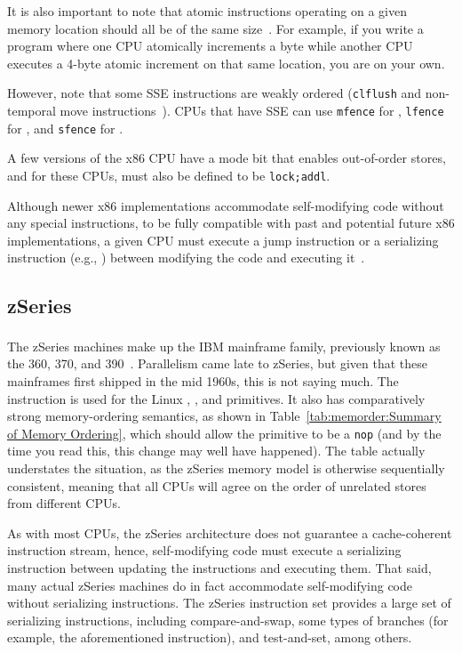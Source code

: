 It is also important to note that atomic instructions operating
on a given memory location should all be of the same
size~\cite[Section 8.1.2.2]{Intel64IA32v3A2011}.
For example, if you write a program where one CPU atomically increments
a byte while another CPU executes a 4-byte atomic increment on
that same location, you are on your own.

However, note that some SSE instructions are weakly ordered ({\tt clflush}
and non-temporal move instructions~\cite{IntelXeonV2b-96a}).
CPUs that have SSE can use {\tt mfence} for ,
{\tt lfence} for , and {\tt sfence} for .

A few versions of the x86 CPU have a mode bit that enables out-of-order
stores, and for these CPUs,  must also be defined to
be {\tt lock;addl}.

Although newer x86 implementations accommodate self-modifying code
without any special instructions, to be fully compatible with
past and potential future x86 implementations, a given CPU must
execute a jump instruction or a serializing instruction (e.g., )
between modifying the code and executing
it~\cite[Section 8.1.3]{Intel64IA32v3A2011}.

\subsection{zSeries}

The zSeries machines make up the IBM\textsuperscript{\texttrademark}
mainframe family, previously
known as the 360, 370, and 390~\cite{IBMzSeries04a}.
Parallelism came late to zSeries, but given that these mainframes first
shipped in the mid 1960s, this is not saying much.
The  instruction is used for the Linux ,
, and  primitives.
It also has comparatively strong memory-ordering semantics, as shown in
Table~\ref{tab:memorder:Summary of Memory Ordering}, which should allow the
 primitive to be a {\tt nop} (and by the time you read this,
this change may well have happened).
The table actually understates the situation, as the zSeries memory model
is otherwise sequentially consistent, meaning that all CPUs
will agree on the order of unrelated stores from different CPUs.

As with most CPUs, the zSeries architecture does not guarantee a
cache-coherent instruction stream, hence,
self-modifying code must execute a serializing instruction between updating
the instructions and executing them.
That said, many actual zSeries machines do in fact accommodate self-modifying
code without serializing instructions.
The zSeries instruction set provides a large set of serializing instructions,
including compare-and-swap, some types of branches (for example, the
aforementioned  instruction), and test-and-set,
among others.

